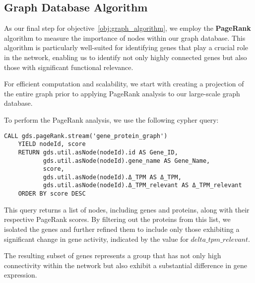 \subsection{Graph Database Algorithm} \label{subsec:graph_database_algo}
As our final step for objective~\ref{obj:graph_algorithm},
we employ the \textbf{PageRank} algorithm to measure the importance of nodes within our graph database.
This algorithm is particularly well-suited for identifying genes that play a crucial role in the network,
enabling us to identify not only highly connected genes but also those with significant functional relevance.

For efficient computation and scalability,
we start with creating a projection of the entire graph prior to applying PageRank analysis to our large-scale graph database.

To perform the PageRank analysis, we use the following cypher query:
\begin{lstlisting}[language=Cypher, label={lst:pagerank}]
    CALL gds.pageRank.stream('gene_protein_graph')
    YIELD nodeId, score
    RETURN gds.util.asNode(nodeId).id AS Gene_ID,
           gds.util.asNode(nodeId).gene_name AS Gene_Name,
           score,
           gds.util.asNode(nodeId).Δ_TPM AS Δ_TPM,
           gds.util.asNode(nodeId).Δ_TPM_relevant AS Δ_TPM_relevant
    ORDER BY score DESC
\end{lstlisting}

This query returns a list of nodes, including genes and proteins, along with their respective PageRank scores.
By filtering out the proteins from this list, we isolated the genes and
further refined them to include only those exhibiting a significant change in gene activity,
indicated by the value for $delta\_tpm\_relevant$.

The resulting subset of genes represents a group that has not only high connectivity
within the network but also exhibit a substantial difference in gene expression.